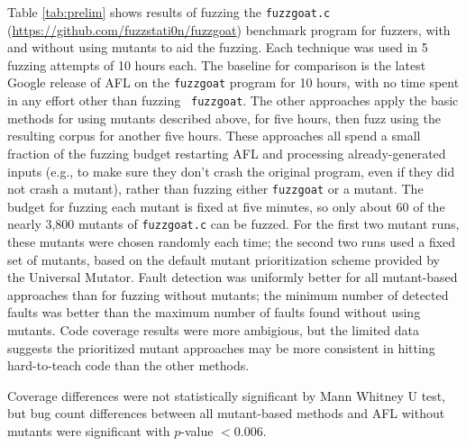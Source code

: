 Table \ref{tab:prelim} shows results of fuzzing the {\tt fuzzgoat.c}
(\url{https://github.com/fuzzstati0n/fuzzgoat}) benchmark program for
fuzzers, with and without using mutants to aid the fuzzing.  Each
technique was used in 5 fuzzing attempts of 10 hours each.  The
baseline for comparison is the latest Google release of  AFL on the {\tt fuzzgoat} program for 10
hours, with no time spent in any effort other than fuzzing {\tt
  fuzzgoat}.  The other approaches apply the basic methods for using
mutants described above, for five hours, then fuzz using the resulting
corpus for another five hours.  These approaches all spend a small
fraction of the fuzzing budget restarting AFL and processing
already-generated inputs (e.g., to make sure they don't crash the
original program, even if they did not crash a mutant), rather than
fuzzing either {\tt fuzzgoat} or a mutant.  The budget for fuzzing
each mutant is fixed at five minutes, so only about 60 of the nearly
3,800 mutants of {\tt fuzzgoat.c} can be fuzzed.  For the first two
mutant runs, these mutants were chosen randomly each time; the second
two runs used a fixed set of mutants, based on the default mutant
prioritization scheme provided by the Universal Mutator.  Fault
detection was uniformly better for all mutant-based approaches than
for fuzzing without mutants; the minimum number of detected faults was
better than the maximum number of faults found without using mutants.
Code coverage results were more ambigious, but the limited data
suggests the prioritized mutant approaches may be more consistent in
hitting hard-to-teach code than the other methods.

Coverage differences were not statistically significant by Mann
Whitney U test, but bug count differences between all mutant-based methods and AFL
without mutants were significant with $p$-value $< 0.006$.
